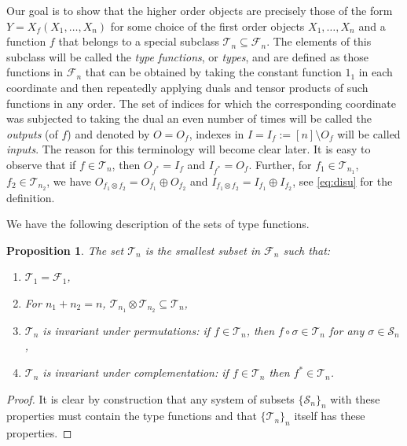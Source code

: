 \documentclass[12pt]{article}
\newtheorem{prop}{Proposition}
\theoremstyle{definition}
\theoremstyle{remark}
\def\Te{\mathcal T}
\def\Fe{\mathcal F}
\def\Se {\mathcal S}
\def\permut{\mathscr{S}}
\begin{document}
Our goal is to show that the higher order objects are precisely those of the form
$Y=X_f(X_1,\dots,X_n)$ for some choice of the
first order objects $X_1,\dots, X_n$ and a function $f$ that belongs to a special subclass
 $\Te_n\subseteq \Fe_n$. The elements of this subclass will be called the {\em type
 functions},
 or {\em types}, and are defined as those functions in $\Fe_n$ that can be obtained by taking
 the constant function $1_1$ in each coordinate and then repeatedly applying duals and tensor
 products of such functions in any order. The set of indices for which the corresponding
 coordinate  was subjected to taking the dual an even number of times will be called the
{\em outputs} (of $f$) and denoted by $O=O_f$, indexes in $I=I_f:=[n]\setminus O_f$ will be
called {\em inputs}. The reason for this terminology will become clear later. It is easy to observe that if $f\in \Te_n$, then $O_{f^*}=I_f$ and $I_{f^*}=O_f$. Further,
for $f_1\in \Te_{n_1}$, $f_2\in \Te_{n_2}$, we have $O_{f_1\otimes f_2}=O_{f_1}\oplus
O_{f_2}$ and  $I_{f_1\otimes f_2}=I_{f_1}\oplus
I_{f_2}$, see \eqref{eq:disu} for the definition.

We have the following  description of the sets of type functions.

\begin{prop}\label{prop:type_min} The set $\Te_n$ is the smallest subset in $\Fe_n$ such
that:
\begin{enumerate}
\item $\Te_1=\Fe_1$,

\item For $n_1+n_2=n$, $\Te_{n_1}\otimes \Te_{n_2}\subseteq \Te_{n}$,
\item $\Te_n$  is invariant under permutations: if $f\in \Te_n$, then $f\circ \sigma\in
\Te_n$ for any $\sigma\in \permut_n$,
\item $\Te_n$  is invariant under complementation: if $f\in \Te_n$ then $f^*\in \Te_n$.

\end{enumerate}

\end{prop}


\begin{proof} It is clear by construction that any system of subsets $\{\Se_n\}_n$ with
these properties must contain the type functions and that $\{\Te_n\}_n$ itself has these
properties.

\end{proof}

  
\end{document}
